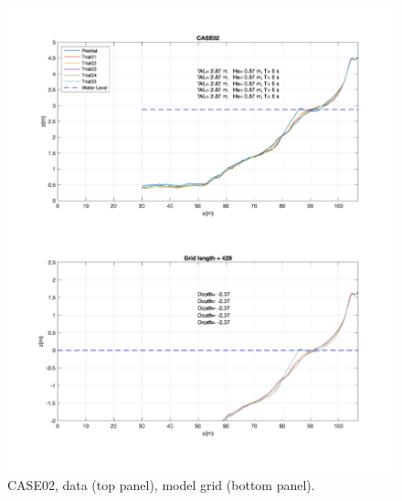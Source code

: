 \documentclass[preprint,10pt]{elsarticle}
\begin{document}
 \begin{figure}
\begin{center}
 \includegraphics[width=1.0\textwidth]{../data/preprocessing/plots/CASE02.jpg}
 \caption{CASE02, data (top panel), model grid (bottom panel).}
 \label{lineargrid}
 \end{center}
 \end{figure}
\end{document}
